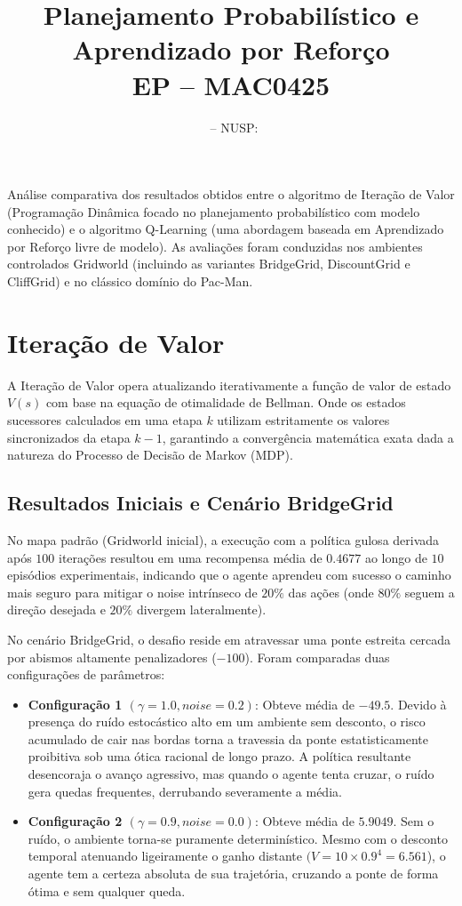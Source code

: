 \documentclass[a4paper,12pt]{article}
\title{\textbf{Planejamento Probabilístico e Aprendizado por Reforço} \\ [1em] \large EP \EP{} -- MAC0425}
\author{\Nome \ -- NUSP: \NUSP}
\date{}
\begin{document}
	
\maketitle
	
Análise comparativa dos resultados obtidos entre o algoritmo de Iteração de Valor (Programação Dinâmica focado no planejamento probabilístico com modelo conhecido) e o algoritmo Q-Learning (uma abordagem baseada em Aprendizado por Reforço livre de modelo). As avaliações foram conduzidas nos ambientes controlados Gridworld (incluindo as variantes BridgeGrid, DiscountGrid e CliffGrid) e no clássico domínio do Pac-Man.	

\section{Iteração de Valor}

A Iteração de Valor opera atualizando iterativamente a função de valor de estado $V(s)$ com base na equação de otimalidade de Bellman. Onde os estados sucessores calculados em uma etapa $k$ utilizam estritamente os valores sincronizados da etapa $k-1$, garantindo a convergência matemática exata dada a natureza do Processo de Decisão de Markov (MDP).

\subsection{Resultados Iniciais e Cenário BridgeGrid}

No mapa padrão (Gridworld inicial), a execução com a política gulosa derivada após $100$ iterações resultou em
uma recompensa média de $0.4677$ ao longo de $10$ episódios experimentais, indicando que o agente
aprendeu com sucesso o caminho mais seguro para mitigar o noise intrínseco de $20\%$ das ações (onde $80\%$
seguem a direção desejada e $20\%$ divergem lateralmente).

No cenário BridgeGrid, o desafio reside em atravessar uma ponte estreita cercada por abismos altamente
penalizadores ($-100$). Foram comparadas duas configurações de parâmetros:

\begin{itemize}
	\item \textbf{Configuração 1 $(\gamma=1.0, noise=0.2)$}: Obteve média de $-49.5$. Devido à presença do ruído estocástico	alto em um ambiente sem desconto, o risco acumulado de cair nas bordas torna a travessia da ponte
	estatisticamente proibitiva sob uma ótica racional de longo prazo. A política resultante desencoraja o avanço
	agressivo, mas quando o agente tenta cruzar, o ruído gera quedas frequentes, derrubando severamente a média.
	\item \textbf{Configuração 2 $(\gamma=0.9, noise=0.0)$}: Obteve média de $5.9049$. Sem o ruído, o ambiente torna-se
	puramente determinístico. Mesmo com o desconto temporal atenuando ligeiramente o ganho distante $(V =
	10 \times 0.9^4 = 6.561$), o agente tem a certeza absoluta de sua trajetória, cruzando a ponte de forma ótima e sem qualquer queda.
\end{itemize}
\end{document}
